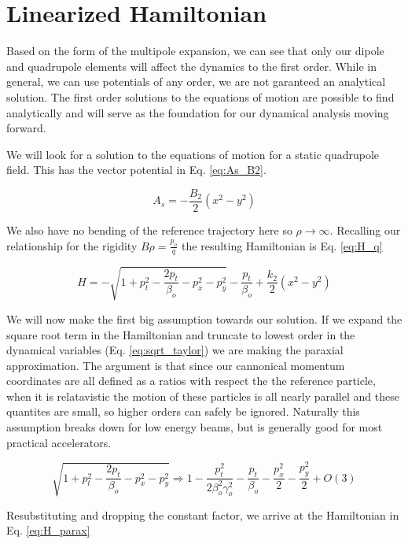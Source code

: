\section{Linearized Hamiltonian} \label{sec:linHam}
Based on the form of the multipole expansion, we can see that only our dipole and quadrupole elements will affect the dynamics to the first order. While in general, we can use potentials of any order, we are not garanteed an analytical solution. The first order solutions to the equations of motion are possible to find analytically and will serve as the foundation for our dynamical analysis moving forward.

We will look for a solution to the equations of motion for a static quadrupole field. This has the vector potential in Eq. \ref{eq:As_B2}.

\begin{equation} \label{eq:As_B2}
	A_s = -\frac{B_2}{2}(x^2 - y^2)
\end{equation}

We also have no bending of the reference trajectory here so $\rho \rightarrow \infty$. Recalling our relationship for the rigidity $B\rho = \frac{p_o}{q}$ the resulting Hamiltonian is Eq. \ref{eq:H_q}

\begin{equation} \label{eq:H_q}
	H = -\sqrt{1 + p_t^2 - \frac{2p_t}{\beta_o} - p_x^2 - p_y^2} - \frac{p_t}{\beta_o} + \frac{k_2}{2}(x^2 - y^2)
\end{equation}

We will now make the first big assumption towards our solution. If we expand the square root term in the Hamiltonian and truncate to lowest order in the dynamical variables (Eq. \ref{eq:sqrt_taylor}) we are making the paraxial approximation. The argument is that since our cannonical momentum coordinates are all defined as a ratios with respect the the reference particle, when it is relatavistic the motion of these particles is all nearly parallel and these quantites are small, so higher orders can safely be ignored. Naturally this assumption breaks down for low energy beams, but is generally good for most practical accelerators.

\begin{equation} \label{eq:sqrt_taylor}
	\sqrt{1 + p_t^2 - \frac{2p_t}{\beta_o} - p_x^2 - p_y^2} \Rightarrow 1 - \frac{p_t^2}{2\beta_o^2\gamma_o^2} - \frac{p_t}{\beta_o} - \frac{p_x^2}{2} - \frac{p_y^2}{2} + O(3)
\end{equation}

Resubstituting and dropping the constant factor, we arrive at the Hamiltonian in Eq. \ref{eq:H_parax}

